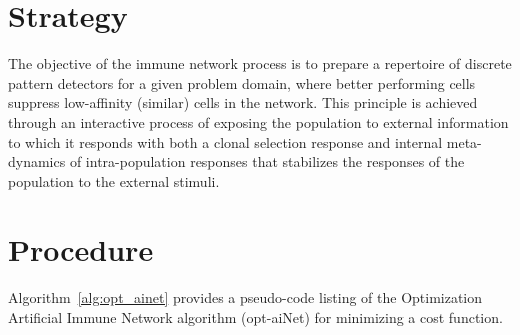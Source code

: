 \documentclass[a4paper, 11pt]{article}
\begin{document}
\section{Strategy}
\label{sec:strategy}
The objective of the immune network process is to prepare a repertoire of discrete pattern detectors for a given problem domain, where better performing cells suppress low-affinity (similar) cells in the network.
This principle is achieved through an interactive process of exposing the population to external information to which it responds with both a clonal selection response and internal meta-dynamics of intra-population responses that stabilizes the responses of the population to the external stimuli.

\section{Procedure}
\label{sec:procedure}
Algorithm~\ref{alg:opt_ainet} provides a pseudo-code listing of the Optimization Artificial Immune Network algorithm (opt-aiNet) for minimizing a cost function. 
\end{document}
